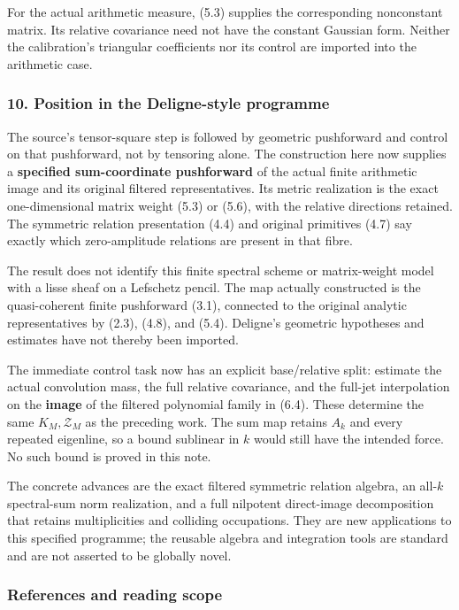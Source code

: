 For the actual arithmetic measure, (5.3) supplies the corresponding
nonconstant matrix. Its relative covariance need not have the constant
Gaussian form. Neither the calibration's triangular coefficients nor its
control are imported into the arithmetic case.

\subsubsection{10. Position in the Deligne-style
programme}\label{spectral_sum_full:position-in-the-deligne-style-programme}

The source's tensor-square step is followed by geometric pushforward and
control on that pushforward, not by tensoring alone. The construction
here now supplies a \textbf{specified sum-coordinate pushforward} of the
actual finite arithmetic image and its original filtered
representatives. Its metric realization is the exact one-dimensional
matrix weight (5.3) or (5.6), with the relative directions retained. The
symmetric relation presentation (4.4) and original primitives (4.7) say
exactly which zero-amplitude relations are present in that fibre.

The result does not identify this finite spectral scheme or
matrix-weight model with a lisse sheaf on a Lefschetz pencil. The map
actually constructed is the quasi-coherent finite pushforward (3.1),
connected to the original analytic representatives by (2.3), (4.8), and
(5.4). Deligne's geometric hypotheses and estimates have not thereby
been imported.

The immediate control task now has an explicit base/relative split:
estimate the actual convolution mass, the full relative covariance, and
the full-jet interpolation on the \textbf{image} of the filtered
polynomial family in (6.4). These determine the same
\(K_M,\mathcal Z_M\) as the preceding work. The sum map retains \(A_k\)
and every repeated eigenline, so a bound sublinear in \(k\) would still
have the intended force. No such bound is proved in this note.

The concrete advances are the exact filtered symmetric relation algebra,
an all-\(k\) spectral-sum norm realization, and a full nilpotent
direct-image decomposition that retains multiplicities and colliding
occupations. They are new applications to this specified programme; the
reusable algebra and integration tools are standard and are not asserted
to be globally novel.

\subsubsection{References and reading
scope}\label{spectral_sum_full:references-and-reading-scope}

